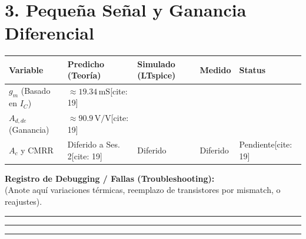 \documentclass[11pt, a4paper]{article}
\begin{document}
\section*{3. Pequeña Señal y Ganancia Diferencial}
\begin{tabularx}{\textwidth}{|>{\raggedright\arraybackslash}p{3cm}|>{\centering\arraybackslash}X|>{\centering\arraybackslash}X|>{\centering\arraybackslash}X|>{\centering\arraybackslash}p{2.5cm}|}
\hline
\rowcolor{ucbblue!20}
\textbf{Variable} & \textbf{Predicho (Teoría)} & \textbf{Simulado (LTspice)} & \textbf{Medido} & \textbf{Status} \\ \hline
$g_m$ (Basado en $I_C$) & $\approx 19.34\,\text{mS}$[cite: 19] & & & \\ \hline
$A_{d,de}$ (Ganancia) & $\approx 90.9\,\text{V/V}$[cite: 19] & & & \\ \hline
$A_c$ y CMRR & Diferido a Ses. 2[cite: 19] & Diferido & Diferido & Pendiente[cite: 19] \\ \hline
\end{tabularx}

\vspace{0.5cm}
\textbf{Registro de Debugging / Fallas (Troubleshooting):} \\
(Anote aquí variaciones térmicas, reemplazo de transistores por mismatch, o reajustes).
\vspace{0.2cm}\hrule\vspace{0.5cm}\hrule\vspace{0.5cm}\hrule
\end{document}
